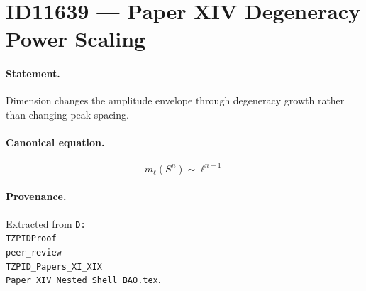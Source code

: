 \section*{ID11639 --- Paper XIV Degeneracy Power Scaling}

\paragraph{Statement.}
Dimension changes the amplitude envelope through degeneracy growth rather than changing peak spacing.

\paragraph{Canonical equation.}
\[
m_\ell(S^n)\sim\ell^{n-1}
\]

\paragraph{Provenance.}
Extracted from \texttt{D:\\TZPIDProof\\peer\_review\\TZPID\_Papers\_XI\_XIX\\Paper\_XIV\_Nested\_Shell\_BAO.tex}.
